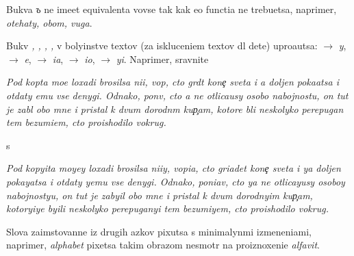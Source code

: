 \documentclass[10pt]{article}
\begin{document}
\noindent
Bukva \textit{ъ} ne ime{\y}et equivalenta vovse tak kak {\y}e{\y}o functi{\y}a ne trebu{\y}etsa,
naprimer, \textit{ot{\y}ehaty, ob{\y}om, v{\y}uga}.

Bukv{\yi} \textit{{\y}, {\e}, {\ia}, {\io}, {\yi}} v boly{\x}instve textov (za iskluceni{\y}em
textov dl{\ia} dete{\y}) upro{\x}a{\y}utsa:
    \textit{{\y}}  $\rightarrow$ \textit{y},
    \textit{{\e}}  $\rightarrow$ \textit{e},
    \textit{{\ia}} $\rightarrow$ \textit{ia},
    \textit{{\io}} $\rightarrow$ \textit{io},
    \textit{{\yi}} $\rightarrow$ \textit{yi}.
Naprimer, sravnite

\textit{
    Pod kop{\yi}ta mo{\y}e{\y} loxadi brosilsa ni{\x}i{\y}, vop{\ia}, cto gr{\ia}d{\e}t kone{\c} sveta i {\y}a doljen poka{\y}atsa i otdaty {\y}emu vse denygi. Odnako, pon{\ia}v, cto {\y}a ne otlica{\y}usy osobo{\y} nabojnost{\y}u, on tut je zab{\yi}l obo mne i pristal k dvum dorodn{\yi}m kup{\c}am, kotor{\yi}{\y}e b{\yi}li neskolyko perepugan{\yi} tem bezumi{\y}em, cto proishodilo vokrug.
}

\noindent s

\textit{
    Pod kopyita moyey loxadi brosilsa ni{\x}iy, vopia, cto griadet kone{\c} sveta i ya doljen pokayatsa i otdaty yemu vse denygi. Odnako, poniav, cto ya ne otlicayusy osoboy nabojnostyu, on tut je zabyil obo mne i pristal k dvum dorodnyim kup{\c}am, kotoryiye byili neskolyko perepuganyi tem bezumiyem, cto proishodilo vokrug.
}

Slova zaimstovann{\yi}{\y}e iz drugih {\y}az{\yi}kov pixutsa s minimalyn{\yi}mi izmeneni{\y}ami, 
naprimer, \textit{alphabet} pixetsa takim obrazom nesmotr{\ia} na proiznoxeni{\y}e \textit{alfavit}.


\end{document}
